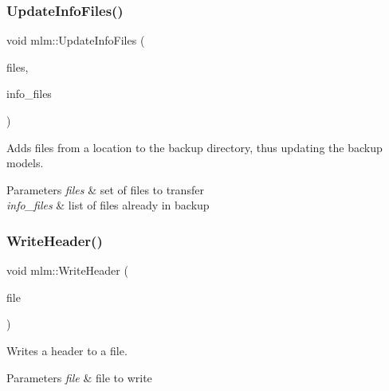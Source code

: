 \subsubsection{\texorpdfstring{Update\+Info\+Files()}{UpdateInfoFiles()}}
{\footnotesize\ttfamily void mlm\+::\+Update\+Info\+Files (\begin{DoxyParamCaption}\item[{std\+::set$<$ \mbox{\hyperlink{structmlm_1_1fileType}{file\+Type}} $>$ const \&}]{files,  }\item[{std\+::list$<$ \mbox{\hyperlink{structmlm_1_1fileType}{file\+Type}} $>$ \&}]{info\+\_\+files }\end{DoxyParamCaption})}



Adds files from a location to the backup directory, thus updating the backup models. 


\begin{DoxyParams}{Parameters}
{\em files} & set of files to transfer \\
\hline
{\em info\+\_\+files} & list of files already in backup \\
\hline
\end{DoxyParams}
\mbox{\label{namespacemlm_a2479e1311fac66b7c4040f8c95393195}} 
\subsubsection{\texorpdfstring{Write\+Header()}{WriteHeader()}}
{\footnotesize\ttfamily void mlm\+::\+Write\+Header (\begin{DoxyParamCaption}\item[{fs\+::ofstream \&}]{file }\end{DoxyParamCaption})}



Writes a header to a file. 


\begin{DoxyParams}{Parameters}
{\em file} & file to write \\
\hline
\end{DoxyParams}
